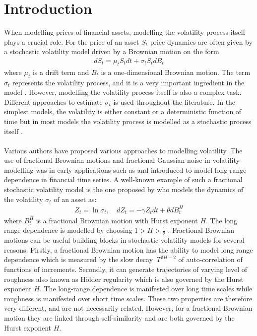 \documentclass{article}
\begin{document}
\section{Introduction}
When modelling prices of financial assets, modelling the volatility process itself plays a crucial role. For the price of an asset $S_t$ price dynamics are often given by a stochastic volatility model driven by a Brownian motion on the form
\begin{align}
dS_t = \mu_tS_t dt+\sigma_tS_t dB_t \label{eq:price_gen}
\end{align}
where $\mu_t$ is a drift term and $B_t$ is a one-dimensional Brownian motion. The term $\sigma_t$ represents the volatility process, and it is a very important ingredient in the model . However, modelling the volatility process itself is also a complex task. Different approaches to estimate $\sigma_t$ is used throughout the literature. In the simplest models, the volatility is either constant or a deterministic function of time but in most models the volatility process is modelled as a stochastic process itself \cite{gatheral}. \\\\
Various authors have proposed various approaches to modelling volatility. The use of fractional Brownian motions and fractional Gaussian noise in volatility modelling was in early applications such as \cite{Bollerslev} and \cite{comte} introduced to model long-range dependence in financial time series. A well-known example of such a fractional stochastic volatility model is the one proposed by \cite{comte} who models the dynamics of the volatility $\sigma_t$ of an asset as:
\begin{align*}
Z_t = \ln\sigma_t, \quad dZ_t = -\gamma Z_t dt+\theta dB^H_t
\end{align*}
where $B^H_t$ is a fractional Brownian motion with Hurst exponent $H$. The long range dependence is modelled by choosing $1>H>\frac{1}{2}$ \cite{comte}. Fractional Brownian motions can be useful building blocks in stochastic volatility models for several reasons. Firstly, a fractional Brownian motion has the ability to model long range dependence which is measured by the slow decay $~T^{2H-2}$ of auto-correlation of functions of increments. Secondly, it can generate trajectories of varying level of roughness also known as Hölder regularity which is also governed by the Hurst exponent $H$. The long-range dependence is manifested over long time scales while roughness is manifested over short time scales. These two properties are therefore very different, and are not necessarily related. However, for a fractional Brownian motion they are linked through self-similarity and are both governed by the Hurst exponent $H$.\\\\
\end{document}
